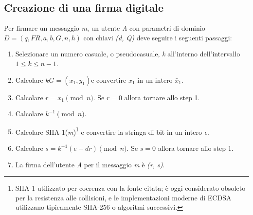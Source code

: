 \documentclass[12pt, a4paper]{report}
\begin{document}
\subsection{Creazione di una firma digitale}
Per firmare un messaggio \textit{m}, un utente \textit{A} con parametri di dominio $D = (q, FR, a, b, G, n, h)$ con chiavi \textit{(d, Q)} deve seguire i seguenti passaggi:
\begin{enumerate}
    \item Selezionare un numero casuale, o pseudocasuale, \textit{k} all'interno dell'intervallo $1 \leq k \leq n - 1$.
    \item Calcolare $kG = (x_1, y_1) \text{e convertire } x_1 \text{ in un intero } \bar{x}_1 $.
    \item Calcolare $r = x_1 \pmod n$. Se $r = 0$ allora tornare allo step 1.
    \item Calcolare $k^{-1} \pmod n$.
    \item Calcolare SHA-1(\textit{m})\footnote{SHA-1 utilizzato per coerenza con la fonte citata; è oggi considerato obsoleto per la resistenza alle collisioni, e le implementazioni moderne di ECDSA utilizzano tipicamente SHA-256 o algoritmi successivi.} e convertire la stringa di bit in un intero \textit{e}.
    \item Calcolare $s = k^{-1}(e + dr) \pmod n$. Se $s = 0$ allora tornare allo step 1.
    \item La firma dell'utente \textit{A} per il messaggio \textit{m} è  \textit{(r, s)}.
\end{enumerate}
\end{document}
